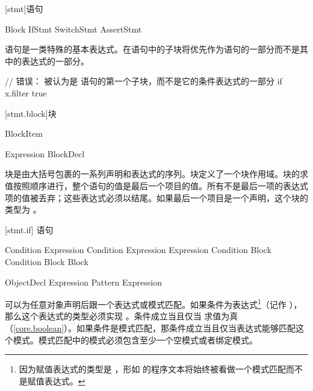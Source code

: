
[stmt]{语句}

\begin{bnf}
 \br
    Block \br
    IfStmt \br
    SwitchStmt \br
    AssertStmt
\end{bnf}

\pnum
语句是一类特殊的基本表达式。在语句中的子块将优先作为语句的一部分而不是其中的表达式的一部分。\enterexample

\begin{codeblock}
// 错误：  被认为是  语句的第一个子块，而不是它的条件表达式的一部分
if x.filter{ true }
\end{codeblock}

\exitexample

[stmt.block]{块}

\begin{bnf}
 \br
    \terminal{\{} BlockItem\bnfs\ \terminal{\}}
\end{bnf}

\begin{bnf}
 \br
    Expression \terminal{;}\bnfq \br
    BlockDecl
\end{bnf}

\pnum
块是由大括号包裹的一系列声明和表达式的序列。块定义了一个块作用域。块的求值按照顺序进行，整个语句的值是最后一个项目的值。所有不是最后一项的表达式项的值被丢弃；这些表达式必须以\tcode{;}结尾。如果最后一个项目是一个声明，这个块的类型为 。

[stmt.if]{ 语句}

\begin{bnf}
 \br
     Condition  Expression \br
     Condition  Expression  Expression \br
     Condition Block \br
     Condition Block  Block
\end{bnf}

\begin{bnf}
 \br
     ObjectDecl\bnfl\tcode{;} \bnflp Expression \bnfv Pattern \terminal{=} Expression \bnfrp
\end{bnf}

\pnum
{}可以为任意对象声明后跟一个表达式或模式匹配。如果条件为表达式\footnote{因为赋值表达式的类型是 ，形如  的程序文本将始终被看做一个模式匹配而不是赋值表达式。}（记作 ），那么这个表达式的类型必须实现 。条件成立当且仅当  求值为真（\ref{core.boolean}）。如果条件是模式匹配，那条件成立当且仅当表达式能够匹配这个模式。模式匹配中的模式必须包含至少一个空模式或者绑定模式。

